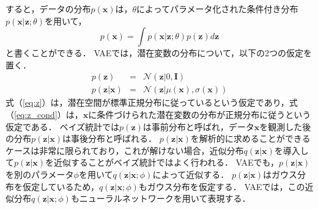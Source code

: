 すると，データの分布$p(\bm{x})$は，$\theta$によってパラメータ化された条件付き分布$p(\bm{x}| \bm{z}; \theta)$を用いて，
\begin{equation}
p(\bm{x}) = \int p(\bm{x}|\bm{z};\theta) p(\bm{z}) d\bm{z} \label{eq:vae}
\end{equation}
と書くことができる．
VAEでは，潜在変数の分布について，以下の2つの仮定を置く．
\begin{eqnarray}
p(\bm{z}) &=& \mathcal{N}(\bm{z}|0,\bm{I}) \label{eq:z}\\
p(\bm{z}|\bm{x}) &=& \mathcal{N}(\bm{z}|\mu(\bm{x}),\sigma(\bm{x}))	\label{eq:z_cond}
\end{eqnarray}
式（\ref{eq:z}）は，潜在空間が標準正規分布に従っているという仮定であり，式（\ref{eq:z_cond}）は，$\bm{x}$に条件づけられた潜在変数の分布が正規分布に従うという仮定である．
ベイズ統計では$p(\bm{z})$は事前分布と呼ばれ，データ$\bm{x}$を観測した後の分布$p(\bm{z}|\bm{x})$は事後分布と呼ばれる．
$p(\bm{z}|\bm{x})$を解析的に求めることができるケースは非常に限られており，これが解けない場合，近似分布$q(\bm{z}|\bm{x})$を導入して$p(\bm{z}|\bm{x})$を近似することがベイズ統計ではよく行われる．
VAEでも，$p(\bm{z}| \bm{x})$を別のパラメータ$\phi$を用いて$q(\bm{z}|\bm{x};\phi)$によって近似する．
$p(\bm{z}|\bm{x})$はガウス分布を仮定しているため，$q(\bm{z}|\bm{x};\phi)$もガウス分布を仮定する．
VAEでは，この近似分布$q(\bm{z}|\bm{x};\phi)$もニューラルネットワークを用いて表現する．

